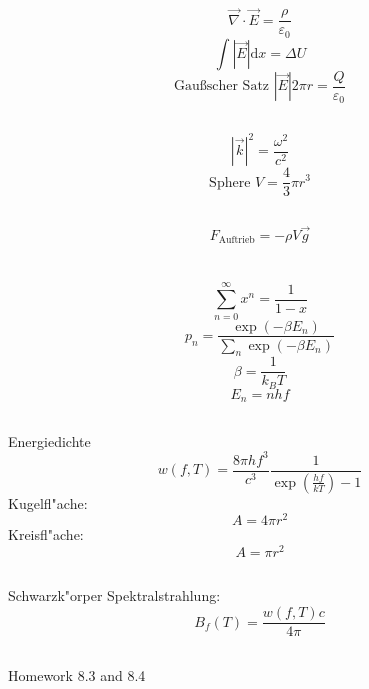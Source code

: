 \documentclass[12pt]{report}
\newcommand{\vabla}{\vec{\nabla}}
\newcommand{\vepsilon}{\varepsilon}
\newcommand{\dd}{\mathrm{d}}
\begin{document}
\subsection{}
\[\vabla\cdot\vec{E}=\frac{\rho}{\vepsilon_0}\]
\[\int|\vec{E}|\dd x=\Delta U\]
\[\textrm{Gau\ss scher Satz }|\vec{E}|2\pi r=\frac{Q}{\vepsilon_0}\]

\subsection{}
\[|\vec{k}|^2=\frac{\omega^2}{c^2}\]
\[\textrm{Sphere }V=\frac{4}{3}\pi r^3\]

\subsection{} 
\[F_\mathrm{Auftrieb}=-\rho V\vec{g}\]

\section{}

\subsection{}
\[\sum_{n=0}^\infty x^n=\frac{1}{1-x}\]
\[p_n=\frac{\exp(-\beta E_n)}{\sum_n\exp(-\beta E_n)}\]
\[\beta=\frac{1}{k_BT}\]
\[E_n=nhf\]

\subsection{}

Energiedichte
\[w(f,T)=\frac{8\pi hf^3}{c^3}\frac{1}{\exp\left(\frac{hf}{kT}\right)-1}\]
Kugelfl"ache:
\[A=4\pi r^2\]
Kreisfl"ache:
\[A=\pi r^2\]

\subsection{}
Schwarzk"orper Spektralstrahlung:
\[B_f(T)=\frac{w(f,T)c}{4\pi}\]

\subsection{}
Homework 8.3 and 8.4

\section{}
\end{document}
